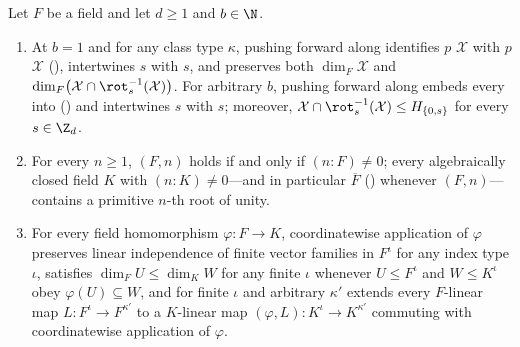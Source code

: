 \begin{proposition}\label{prop:linear-model-bridges}
Let $F$ be a field and let $d \ge 1$ and $b \in \N$.
\begin{enumerate}[label=(\alph*)]
\item At $b = 1$ and for any class type $\kappa$, pushing forward along 
  identifies  $p$ $\mathcal{X}$ with
   $p$ $\mathcal{X}$
  (\cite[Definition~6.3]{SeventeenthPaper2026}), intertwines  $s$ with
   $s$, and preserves both $\dim_F \mathcal{X}$ and
  $\dim_F\bigl(\mathcal{X} \cap \rot_s^{-1}(\mathcal{X})\bigr)$. For arbitrary $b$, pushing forward
  along  embeds every  into
   (\cite[Definition~2.1]{SharedDecoders2026}) and intertwines
   $s$ with  $s$; moreover,
  $\mathcal{X} \cap \rot_s^{-1}(\mathcal{X}) \le H_{\{0, s\}}$ for every $s \in \Z_d$.
\item For every $n \ge 1$, $(F, n)$ holds if and only if $(n : F) \ne 0$; every
  algebraically closed field $K$ with $(n : K) \ne 0$---and in particular $\overline{F}$
  () whenever $(F, n)$---contains a primitive $n$-th
  root of unity.
\item For every field homomorphism $\varphi : F \to K$, coordinatewise application of $\varphi$
  preserves linear independence of finite vector families in $F^\iota$ for any index type $\iota$,
  satisfies $\dim_F U \le \dim_K W$ for any finite $\iota$ whenever $U \le F^\iota$ and
  $W \le K^\iota$ obey $\varphi(U) \subseteq W$, and for finite $\iota$ and arbitrary $\kappa'$ extends
  every $F$-linear map $L : F^\iota \to F^{\kappa'}$ to a $K$-linear map
  $(\varphi, L) : K^\iota \to K^{\kappa'}$ commuting with coordinatewise
  application of $\varphi$.
\end{enumerate}
\end{proposition}
